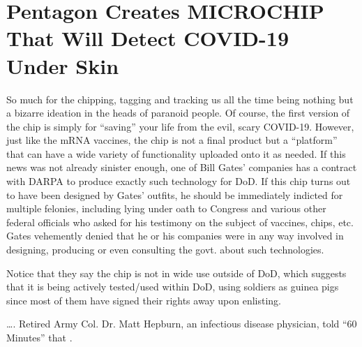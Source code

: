 \chapter{Pentagon Creates MICROCHIP That Will Detect COVID-19 Under Skin}

\begin{refsection}

So much for the chipping, tagging and tracking us all the time being nothing but a bizarre ideation in the heads of paranoid people. Of course, the first version of the chip is simply for \enquote{saving} your life from the evil, scary COVID-19. However, just like the mRNA vaccines, the chip is not a final product but a \enquote{platform} that can have a wide variety of functionality uploaded onto it as needed. If this news was not already sinister enough, one of Bill Gates' companies has a contract with DARPA to produce exactly such technology for DoD. If this chip turns out to have been designed by Gates' outfits, he should be immediately indicted for multiple felonies, including lying under oath to Congress and various other federal officials who asked for his testimony on the subject of vaccines, chips, etc. Gates vehemently denied that he or his companies were in any way involved in designing, producing or even consulting the govt. about such technologies.

Notice that they say the chip is not in wide use outside of DoD, which suggests that it is being actively tested/used within DoD, using soldiers as guinea pigs since most of them have signed their rights away upon enlisting.

\begin{tcolorbox}[quote]

\dots{}. Retired Army Col. Dr. Matt Hepburn, an infectious disease physician, told \enquote{60 Minutes} that .\textsuperscript{\cite{urldsa09yu2}}

\end{tcolorbox}

\begin{tcolorbox}[quote]


\end{tcolorbox}
\end{refsection}
